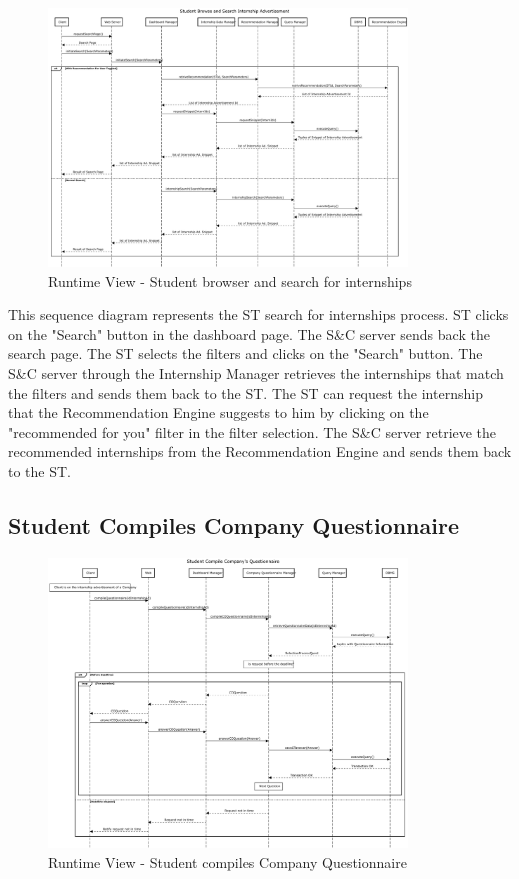 \begin{figure}[H]
      \centering
      \includegraphics[width=0.85\textwidth]{Images/RV_03.pdf}
      \caption{Runtime View - Student browser and search for internships}
      \label{fig:rv-student-browser-and-search-for-internships}
\end{figure}

\par This sequence diagram represents the ST search for internships process. ST clicks on the "Search" button in the dashboard
page. The S\&C server sends back the search page. The ST selects the filters and clicks on the "Search" button. The S\&C server
through the Internship Manager retrieves the internships that match the filters and sends them back to the ST. The ST can
request the internship that the Recommendation Engine suggests to him by clicking on the "recommended for you" filter in the
filter selection. The S\&C server retrieve the recommended internships from the Recommendation Engine and sends them back to the ST.


\subsection{Student Compiles Company Questionnaire}

\begin{figure}[H]
      \centering
      \includegraphics[width=0.85\textwidth]{Images/RV_04a.pdf}
      \caption{Runtime View - Student compiles Company Questionnaire}
      \label{fig:rv-student-compiles-company-questionnaire}
\end{figure}


